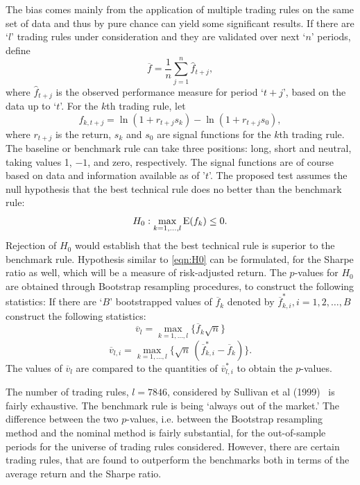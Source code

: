 The bias comes mainly from the application of multiple trading rules on the same set of data and thus by pure chance can yield some significant results. If there are `$l$' trading rules under consideration and they are validated over next `$n$' periods, define
	\begin{equation} \label{eqn:barf}
	\overline{f}= \frac{1}{n} \sum_{j=1}^n\hat{f}_{t+j},
	\end{equation}
where $\hat{f}_{t+j}$ is the observed performance measure for period `$t+j$', based on the data up to `$t$'. For the $k$th trading rule, let
	\begin{equation} \label{eqn:fktj}
	f_{k,t+j}= \ln(1+r_{t+j} s_k) - \ln(1+r_{t+j} s_0),
	\end{equation}
where $r_{t+j}$ is the return, $s_k$ and $s_0$ are signal functions for the $k$th trading rule. The baseline or benchmark rule can take three positions: long, short and neutral, taking values 1, $-1$, and zero, respectively. The signal functions are of course based on data and information available as of '$t$'. The proposed test assumes the null hypothesis that the best technical rule does no better than the benchmark rule:
	\begin{equation} \label{eqn:H0}
	H_0: \max_{k=1,\ldots,l} \Ex(f_k) \leq 0.
	\end{equation}
Rejection of $H_0$ would establish that the best technical rule is superior to the benchmark rule. Hypothesis similar to \eqref{eqn:H0} can be formulated, for the Sharpe ratio as well, which will be a measure of risk-adjusted return. The $p$-values for $H_0$ are obtained through Bootstrap resampling procedures, to construct the following statistics:
If there are `$B$' bootstrapped values of $\overline{f}_k$ denoted by $\overline{f}_{k,i}^*, i=1,2,\ldots,B$ construct the following statistics:
	\begin{equation} \label{eqn:linev}
	\overline{v}_l = \max_{k=1,\ldots,l} \{ \overline{f}_k \sqrt{n} \}
	\end{equation}
	\begin{equation} \label{eqn:linevli}
	\overline{v}_{l,i} = \max_{k=1,\ldots,l} \{\sqrt{n}\,(\overline{f}_{k,i}^* - \overline{f}_k) \}.
	\end{equation}
The values of $\overline{v}_l$ are compared to the quantities of $\overline{v}_{l,i}^*$ to obtain the $p$-values.


The number of trading rules, $l=7846$, considered by Sullivan et al (1999)~\cite{sullivan1999data} is fairly exhaustive. The benchmark rule is being `always out of the market.' The difference between the two $p$-values, i.e. between the Bootstrap resampling method and the nominal method is fairly substantial, for the out-of-sample periods for the universe of trading rules considered. However, there are certain trading rules, that are found to outperform the benchmarks both in terms of the average return and the Sharpe ratio.


